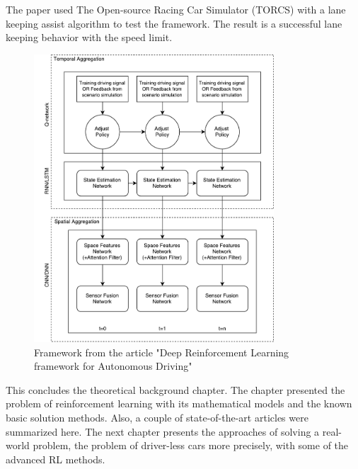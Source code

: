 The paper used The Open-source Racing Car Simulator (TORCS) with a lane keeping assist algorithm to test the framework. The result is a successful lane keeping behavior with the speed limit.       

\begin{figure}[H]
	\centering
	\includegraphics[width=0.8\textwidth]{Figures/TheoreticalBackground/Framework_article}
	\caption{Framework from the article "Deep Reinforcement Learning framework for Autonomous Driving" \cite{Sallab:2017:2470-1173:70} }
	\label{fig:Framework_article}
\end{figure}
 
This concludes the theoretical background chapter. The chapter presented the problem of reinforcement learning with its mathematical models and the known basic solution methods. Also, a couple of state-of-the-art articles were summarized here. The next chapter presents the approaches of solving a real-world problem, the problem of driver-less cars more precisely, with some of the advanced RL methods.